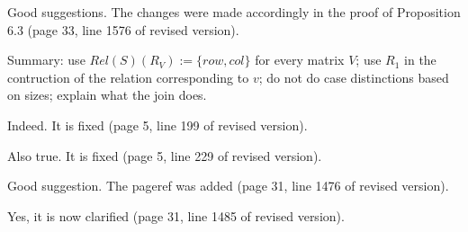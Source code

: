 \answer Good suggestions. The changes were made accordingly in the proof of Proposition 6.3 (page 33, line 1576 of revised version).

Summary: use $Rel(S)(R_V) := \{row, col\}$ for every matrix $V$; use $R_1$ in the contruction of the relation corresponding to $v$; do not do case distinctions based on sizes; explain what the join does.
\bigskip

\begin{comment}
line 183: this is ugly to read. Please align at := and at if.
\end{comment}

\answer Indeed. It is fixed (page 5, line 199 of revised version).
\bigskip

\begin{comment}
	line 216: this also should be aligned.
\end{comment}

\answer Also true. It is fixed (page 5, line 229 of revised version).
\bigskip

\begin{comment}
	line 1386: Please rephrase. One could get the impression that the halting problem for linear time TMs is undecidable (which it certainly is not).
\end{comment}

\answer \TODO
{}
\bigskip

\begin{comment}
	line 1435: please provide a pageref for figure 4 or mention that it is at the very end of the article.
\end{comment}

\answer Good suggestion. The pageref was added (page 31, line 1476 of revised version).
\bigskip

\begin{comment}
	line 1443: You have to restrict the expression e, such that it cannot use X. Otherwise Proposition 6.1 is definitely not true.
\end{comment}

\answer Yes, it is now clarified (page 31, line 1485 of revised version).
\bigskip

\begin{comment}
	line 1449: Using your ill-defined definition of expressions of polynomial
	degree, the proof of Proposition 6.1 is nontrivial and cannot be omitted. You
	have to show that every expression of sum-MATLANG can be converted to a
	circuit family of polynomial degree, meeting the syntactic definition of the circuits.
	Showing that you cannot produce superpolynomial matrix entries is not enough.
\end{comment}

